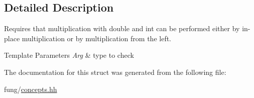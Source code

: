 \subsection{Detailed Description}
Requires that multiplication with double and int can be performed either by in-\/place multiplication or by multiplication from the left. 


\begin{DoxyTemplParams}{Template Parameters}
{\em Arg} & type to check \\
\hline
\end{DoxyTemplParams}


The documentation for this struct was generated from the following file\-:\begin{DoxyCompactItemize}
\item 
fung/\hyperlink{concepts_8hh}{concepts.\-hh}\end{DoxyCompactItemize}

